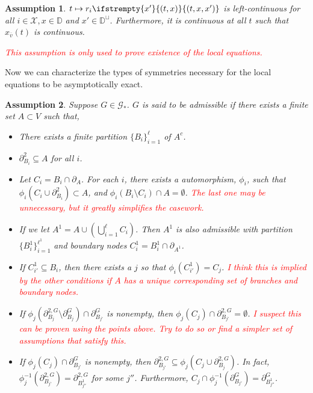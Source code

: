 \documentclass[12pt]{article}
\newcommand{\mb}{\mathbb}
\newcommand{\mc}{\mathcal}
\newcommand{\ov}{\overline}
\newcommand{\tr}{\textcolor{red}}
\newcommand{\cad}{\mb{D}}							%
\newcommand{\sta}{\mc{X}}							%
\newcommand{\neigh}[1]{\partial_{#1}}				%
\newcommand{\dneigh}[1]{\partial^2_{#1}}			%
\newcommand{\gneigh}[2]{\partial^{#1}_{#2}}			%
\newcommand{\dgneigh}[2]{\partial^{2,#1}_{#2}}		%
\newcommand{\cl}[1]{\ov{#1}}						%
\newcommand{\indx}[1]{^{#1}}						%
\newcommand{\rate}{r}								%
\newcommand{\xf}{x}									%
\newcommand{\vind}[1]{_{#1}}						%
\newcommand{\tme}[1]{(#1)}							%
\newcommand{\stpara}[1]{_{#1}}						%
\newcommand{\psize}{\ell}							%
\newcommand{\Gs}{\mc{G}_\ast}						%
\newcommand{\tmepro}[3]{
\ifstrempty{#3}{
	(#1,#2)}{
	(#1,#2,#3)}}									%
\newtheorem{assu}{Assumption}
\begin{document}
\begin{assu}
\(t\mapsto \rate\stpara{i}\tmepro{t}{\xf}{\xf'}\) is left-continuous for all \(i\in \sta,\xf\in \cad\) and \(\xf'\in \cad^\sqcup\). Furthermore, it is continuous at all \(t\) such that \(\xf\vind{\cl{v}}\tme{t}\) is continuous. 

\tr{This assumption is only used to prove existence of the local equations.}
\label{a::lctr}
\end{assu}

Now we can characterize the types of symmetries necessary for the local equations to be asymptotically exact.

\begin{assu}
Suppose \(G \in \Gs\). \(G\) is said to be admissible if there exists a finite set \(A \subset V\) such that,

\begin{itemize}
\item There exists a finite partition \(\{B_i\}_{i=1}^\psize\) of \(A^c\).

\item \(\dneigh{B_i} \subseteq A\) for all \(i\).

\item Let \(C_i = B_i\cap\neigh{A}\). For each \(i\), there exists a automorphism, \(\phi_i\), such that \(\phi_i(C_i\cup \dneigh{B_i}) \subset A\), and \(\phi_i(B_i\setminus C_i)\cap A = \emptyset\). \tr{The last one may be unnecessary, but it greatly simplifies the casework.}

\item If we let \(A\indx{1} = A\cup \left(\bigcup_{i=1}^\psize C_i\right)\). Then \(A\indx{1}\) is also admissible with partition \(\{B\indx{1}_i\}_{i=1}^{\psize\indx{1}}\) and boundary nodes \(C\indx{1}_i = B\indx{1}_i\cap \neigh{A\indx{1}}\).

\item If \(C\indx{1}_{i'} \subseteq B_i\), then there exists a \(j\) so that \(\phi_i(C\indx{1}_{i'}) = C_j\). \tr{I think this is implied by the other conditions if \(A\) has a unique corresponding set of branches and boundary nodes.}

\item If \(\phi_j(\dgneigh{G}{B_j}\setminus\gneigh{G}{B_j})\cap\gneigh{G}{B_{j'}}\) is nonempty, then \(\phi_j(C_j)\cap\dgneigh{G}{B_{j'}} = \emptyset\). \tr{I suspect this can be proven using the points above. Try to do so or find a simpler set of assumptions that satisfy this.}

\item If \(\phi_j(C_j) \cap \gneigh{G}{B_{j'}}\) is nonempty, then \(\dgneigh{G}{B_{j'}} \subseteq \phi_j(C_j\cup\dgneigh{G}{B_j})\). In fact, \(\phi_j^{-1}(\dgneigh{G}{B_{j'}}) = \dgneigh{G}{B_{j''}\indx{1}}\) for some \(j''\). Furthermore, \(C_j\cap\phi_j^{-1}(\gneigh{G}{B_{j'}}) = \gneigh{G}{B_{j''}\indx{1}}\).
\end{itemize}


\end{assu}
\end{document}
